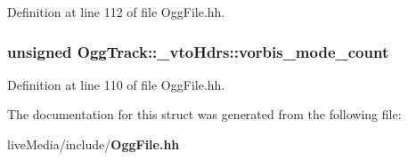 Definition at line 112 of file Ogg\+File.\+hh.

\subsubsection[{vorbis\+\_\+mode\+\_\+count}]{\setlength{\rightskip}{0pt plus 5cm}unsigned Ogg\+Track\+::\+\_\+vto\+Hdrs\+::vorbis\+\_\+mode\+\_\+count}\label{structOggTrack_1_1__vtoHdrs_a4fbb9ef6cce8547589a46c89cb563a5d}


Definition at line 110 of file Ogg\+File.\+hh.



The documentation for this struct was generated from the following file\+:\begin{DoxyCompactItemize}
\item 
live\+Media/include/{\bf Ogg\+File.\+hh}\end{DoxyCompactItemize}
